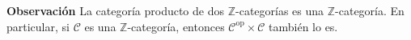 \documentclass[preview]{standalone}
\begin{document}
\begin{center}
\flushleft \textbf{Observación} La categoría producto de dos $\mathbb{Z}$-categorías es una $\mathbb{Z}$-categoría. En particular, si $\mathscr{C}$ es una $\mathbb{Z}$-categoría, entonces $\mathscr{C}^\text{op}\times\mathscr{C}$ también lo es.
\end{center}
\end{document}
